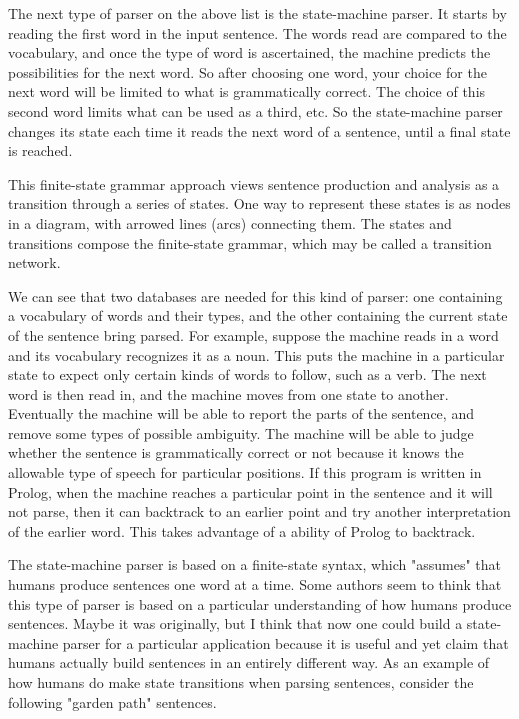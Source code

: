 The next type of parser on the above list is the state-machine parser. It starts by reading the first word in the input sentence. The words read are compared to the vocabulary, and once the type of word is ascertained, the machine predicts the possibilities for the next word. So after choosing one word, your choice for the next word will be limited to what is grammatically correct. The choice of this second word limits what can be used as a third, etc. So the state-machine parser changes its state each time it reads the next word of a sentence, until a final state is reached.

This finite-state grammar approach views sentence production and analysis as a transition through a series of states. One way to represent these states is as nodes in a diagram, with arrowed lines (arcs) connecting them. The states and transitions compose the finite-state grammar, which may be called a transition network.

We can see that two databases are needed for this kind of parser: one containing a vocabulary of words and their types, and the other containing the current state of the sentence bring parsed. For example, suppose the machine reads in a word and its vocabulary recognizes it as a noun. This puts the machine in a particular state to expect only certain kinds of words to follow, such as a verb. The next word is then read in, and the machine moves from one state to another. Eventually the machine will be able to report the parts of the sentence, and remove some types of possible ambiguity. The machine will be able to judge whether the sentence is grammatically correct or not because it knows the allowable type of speech for particular positions. If this program is written in Prolog, when the machine reaches a particular point in the sentence and it will not parse, then it can backtrack to an earlier point and try another interpretation of the earlier word. This takes advantage of a ability of Prolog to backtrack.

The state-machine parser is based on a finite-state syntax, which "assumes" that humans produce sentences one word at a time. Some authors seem to think that this type of parser is based on a particular understanding of how humans produce sentences. Maybe it was originally, but I think that now one could build a state-machine parser for a particular application because it is useful and yet claim that humans actually build sentences in an entirely different way. As an example of how humans do make state transitions when parsing sentences, consider the following "garden path" sentences.

